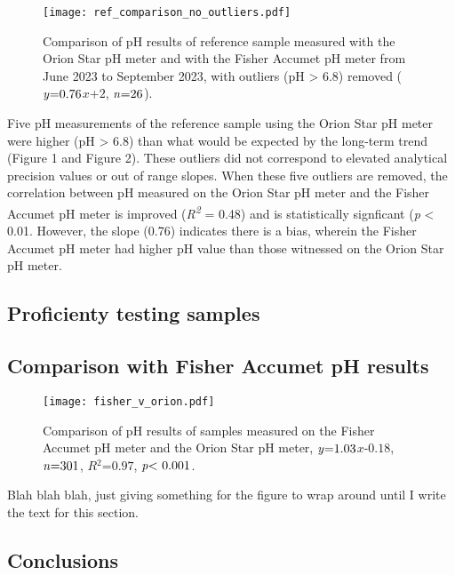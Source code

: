\documentclass[
]{article}
\begin{document}
\begin{wrapfigure}{r}{0.5\textwidth}
  \texttt{[image: ref\_comparison\_no\_outliers.pdf]}
  \caption{Comparison of pH results of reference sample measured with the Orion Star pH meter and with the Fisher Accumet pH meter from June 2023 to September 2023, with outliers (pH > 6.8) removed ($\mbox{\textit{y}=0.76}$$\textit{x}$+$\mbox{2}$, $\mbox{\textit{n}=26}$).}
\end{wrapfigure}

Five pH measurements of the reference sample using the Orion Star pH
meter were higher (pH \textgreater{} 6.8) than what would be expected by
the long-term trend (Figure 1 and Figure 2). These outliers did not
correspond to elevated analytical precision values or out of range
slopes. When these five outliers are removed, the correlation between pH
measured on the Orion Star pH meter and the Fisher Accumet pH meter is
improved (\emph{R\textsuperscript{2}} = 0.48) and is statistically
signficant (\emph{p} \textless{} 0.01. However, the slope (0.76)
indicates there is a bias, wherein the Fisher Accumet pH meter had
higher pH value than those witnessed on the Orion Star pH meter.

\pagebreak

\hypertarget{proficienty-testing-samples}{%
\subsection{Proficienty testing
samples}\label{proficienty-testing-samples}}

\hypertarget{comparison-with-fisher-accumet-ph-results}{%
\subsection{Comparison with Fisher Accumet pH
results}\label{comparison-with-fisher-accumet-ph-results}}

\begin{wrapfigure}{r}{0.5\textwidth}
  \texttt{[image: fisher\_v\_orion.pdf]}
  \caption{Comparison of pH results of samples measured on the Fisher Accumet pH meter and the Orion Star pH meter, $\mbox{\textit{y}=1.03}$$\textit{x}$$\mbox{-0.18}$, $\mbox{\textit{n}=301}$, $\textit{R}$$^2$$\mbox{=0.97}$, $\mbox{\textit{p}< 0.001}$.}
\end{wrapfigure}

Blah blah blah, just giving something for the figure to wrap around
until I write the text for this section.

\hypertarget{conclusions}{%
\subsection{Conclusions}\label{conclusions}}
\end{document}
